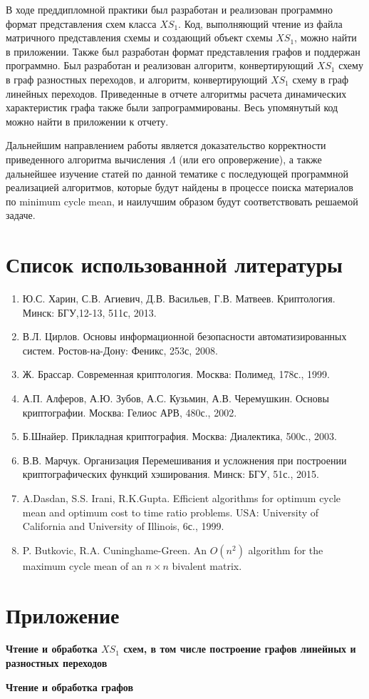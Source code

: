 \documentclass[a4paper,12pt]{extarticle}
\theoremstyle{plain} %
\begin{document}
\begin{large}
В ходе преддипломной практики был разработан и реализован программно формат представления схем класса $XS_1$. Код, выполняющий чтение из файла матричного представления схемы и создающий объект схемы $XS_1$, можно найти в приложении. Также был разработан формат представления графов и поддержан программно. Был разработан и реализован алгоритм, конвертирующий $XS_1$ схему в граф разностных переходов, и алгоритм, конвертирующий $XS_1$ схему в граф линейных переходов. Приведенные в отчете алгоритмы расчета динамических характеристик графа также были запрограммированы. Весь упомянутый код можно найти в приложении к отчету.

Дальнейшим направлением работы является доказательство корректности приведенного алгоритма вычисления $\Lambda$ (или его опровержение), а также дальнейшее изучение статей по данной тематике с последующей программной реализацией алгоритмов, которые будут найдены в процессе поиска материалов по minimum cycle mean, и наилучшим образом будут соответствовать решаемой задаче.


\newpage
\section*{Список использованной литературы}
\vspace*{1cm}

\begin{enumerate}
\item Ю.С. Харин, С.В. Агиевич, Д.В. Васильев, Г.В. Матвеев. Криптология.  Минск: БГУ,12-13, 511с, 2013.
\item В.Л. Цирлов. Основы информационной безопасности автоматизированных систем. Ростов-на-Дону: Феникс, 253с, 2008.
\item Ж. Брассар. Современная криптология. Москва: Полимед, 178с., 1999.
\item А.П. Алферов, А.Ю. Зубов, А.С. Кузьмин, А.В. Черемушкин. Основы криптографии. Москва: Гелиос АРВ, 480с., 2002.
\item Б.Шнайер. Прикладная криптография. Москва: Диалектика, 500с., 2003.
\item В.В. Марчук. Организация Перемешивания и усложнения при построении криптографических функций хэширования. Минск: БГУ, 51с., 2015.
\item A.Dasdan, S.S. Irani, R.K.Gupta. Efficient algorithms for optimum cycle mean and optimum cost to time ratio problems. USA: University of California and University of Illinois, 6с., 1999.
\item P. Butkovic, R.A. Cuninghame-Green. An $O(n^2)$ algorithm for the maximum cycle mean of an $n \times n$ bivalent matrix. 
\end{enumerate}
\end{large}
\newpage
\section*{Приложение}
\vspace*{1cm}

\textbf{Чтение и обработка $XS_1$ схем, в том числе построение графов линейных и разностных переходов}



\textbf{Чтение и обработка графов}


\end{document}
